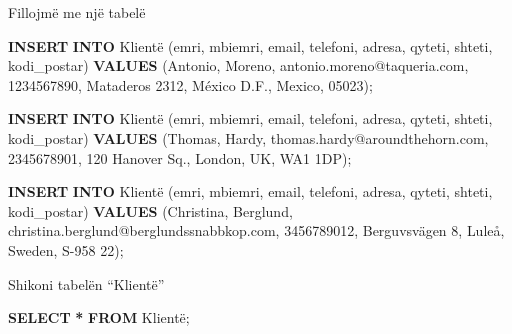 \documentclass[
  ignorenonframetext,
]{beamer}
\newenvironment{Shaded}{\begin{snugshade}}{\end{snugshade}}
\newcommand{\KeywordTok}[1]{\textcolor[rgb]{0.13,0.29,0.53}{\textbf{#1}}}
\newcommand{\NormalTok}[1]{#1}
\newcommand{\OperatorTok}[1]{\textcolor[rgb]{0.81,0.36,0.00}{\textbf{#1}}}
\newcommand{\StringTok}[1]{\textcolor[rgb]{0.31,0.60,0.02}{#1}}
\begin{document}
\begin{frame}[fragile]{Fillojmë me një tabelë}
\begin{Shaded}
\begin{Highlighting}[]
\KeywordTok{INSERT} \KeywordTok{INTO}\NormalTok{ Klientë (emri, mbiemri, email, telefoni, adresa, qyteti, shteti, kodi\_postar)}
\KeywordTok{VALUES}\NormalTok{ (}\StringTok{\textquotesingle{}Antonio\textquotesingle{}}\NormalTok{, }\StringTok{\textquotesingle{}Moreno\textquotesingle{}}\NormalTok{, }\StringTok{\textquotesingle{}antonio.moreno@taqueria.com\textquotesingle{}}\NormalTok{, }\StringTok{\textquotesingle{}1234567890\textquotesingle{}}\NormalTok{, }\StringTok{\textquotesingle{}Mataderos 2312\textquotesingle{}}\NormalTok{, }\StringTok{\textquotesingle{}México D.F.\textquotesingle{}}\NormalTok{, }\StringTok{\textquotesingle{}Mexico\textquotesingle{}}\NormalTok{, }\StringTok{\textquotesingle{}05023\textquotesingle{}}\NormalTok{);}

\KeywordTok{INSERT} \KeywordTok{INTO}\NormalTok{ Klientë (emri, mbiemri, email, telefoni, adresa, qyteti, shteti, kodi\_postar)}
\KeywordTok{VALUES}\NormalTok{ (}\StringTok{\textquotesingle{}Thomas\textquotesingle{}}\NormalTok{, }\StringTok{\textquotesingle{}Hardy\textquotesingle{}}\NormalTok{, }\StringTok{\textquotesingle{}thomas.hardy@aroundthehorn.com\textquotesingle{}}\NormalTok{, }\StringTok{\textquotesingle{}2345678901\textquotesingle{}}\NormalTok{, }\StringTok{\textquotesingle{}120 Hanover Sq.\textquotesingle{}}\NormalTok{, }\StringTok{\textquotesingle{}London\textquotesingle{}}\NormalTok{, }\StringTok{\textquotesingle{}UK\textquotesingle{}}\NormalTok{, }\StringTok{\textquotesingle{}WA1 1DP\textquotesingle{}}\NormalTok{);}

\KeywordTok{INSERT} \KeywordTok{INTO}\NormalTok{ Klientë (emri, mbiemri, email, telefoni, adresa, qyteti, shteti, kodi\_postar)}
\KeywordTok{VALUES}\NormalTok{ (}\StringTok{\textquotesingle{}Christina\textquotesingle{}}\NormalTok{, }\StringTok{\textquotesingle{}Berglund\textquotesingle{}}\NormalTok{, }\StringTok{\textquotesingle{}christina.berglund@berglundssnabbkop.com\textquotesingle{}}\NormalTok{, }\StringTok{\textquotesingle{}3456789012\textquotesingle{}}\NormalTok{, }\StringTok{\textquotesingle{}Berguvsvägen 8\textquotesingle{}}\NormalTok{, }\StringTok{\textquotesingle{}Luleå\textquotesingle{}}\NormalTok{, }\StringTok{\textquotesingle{}Sweden\textquotesingle{}}\NormalTok{, }\StringTok{\textquotesingle{}S{-}958 22\textquotesingle{}}\NormalTok{);}
\end{Highlighting}
\end{Shaded}
\end{frame}

\begin{frame}[fragile]{Shikoni tabelën ``Klientë''}
\label{shikoni-tabeluxebn-klientuxeb}
\begin{Shaded}
\begin{Highlighting}[]
\KeywordTok{SELECT} \OperatorTok{*} \KeywordTok{FROM}\NormalTok{ Klientë;}
\end{Highlighting}
\end{Shaded}
\end{frame}
\end{document}

